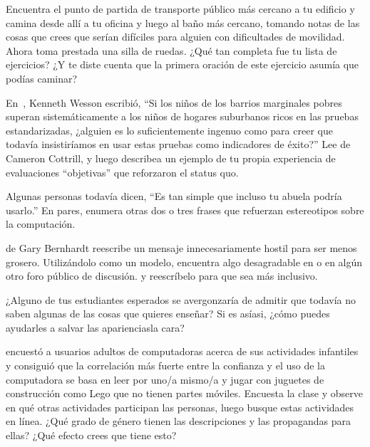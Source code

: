 
Encuentra el punto de partida de transporte público más cercano a tu edificio
y camina desde allí a tu oficina y luego al baño más cercano,
tomando notas de las cosas que crees que serían difíciles para alguien con dificultades de movilidad.
Ahora toma prestada una silla de ruedas.
¿Qué tan completa fue tu lista de ejercicios?
¿Y te diste cuenta que la primera oración de este ejercicio asumía que podías caminar?


En~\cite{Litt2004},
Kenneth Wesson escribió,
``Si los niños de los barrios marginales pobres superan sistemáticamente a los niños de hogares suburbanos ricos en las pruebas estandarizadas,
¿alguien es lo suficientemente ingenuo como para creer que todavía insistiríamos en usar estas pruebas como indicadores de éxito?''
Lee 
de Cameron Cottrill,
y luego describea un ejemplo de tu propia experiencia de evaluaciones ``objetivas'' que reforzaron el status quo.


Algunas personas todavía dicen, ``Es tan simple que incluso tu abuela podría usarlo.''
En pares,
enumera otras dos o tres frases que refuerzan estereotipos sobre la computación.


de Gary Bernhardt
reescribe un mensaje innecesariamente hostil para ser menos grosero.
Utilizándolo como un modelo,
encuentra algo desagradable en  o en algún otro foro público de discusión.
y reescríbelo para que sea más inclusivo.


¿Alguno de tus estudiantes esperados se avergonzaría de admitir que
todavía no saben algunas de las cosas que quieres enseñar?
Si es asíasi,
¿cómo puedes ayudarles a salvar las aparienciasla cara?


\cite{Cutt2017} encuestó a usuarios adultos de computadoras acerca de sus actividades infantiles
y consiguió que la correlación más fuerte entre la confianza y el uso de la computadora
se basa en leer por uno/a mismo/a y jugar con juguetes de construcción como Lego que no tienen partes móviles.
Encuesta la clase y observe en qué otras actividades participan las personas,
luego busque estas actividades en línea.
¿Qué grado de género tienen las descripciones y las propagandas para ellas?
¿Qué efecto crees que tiene esto?

